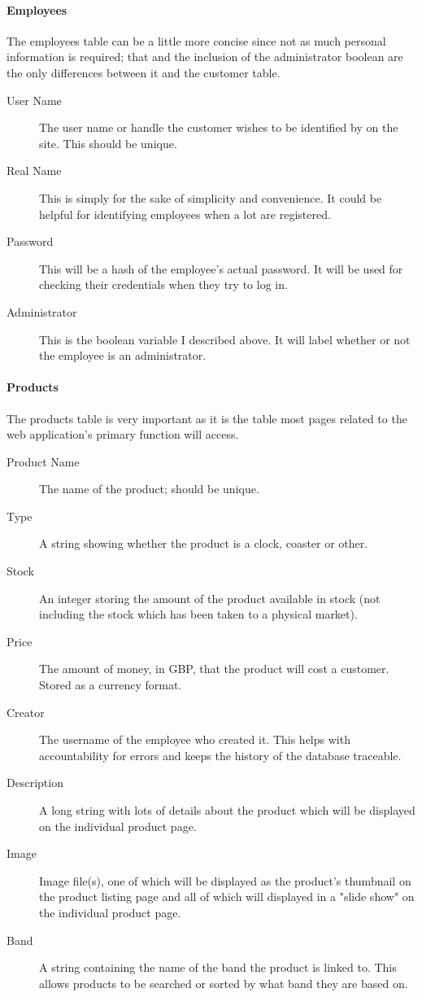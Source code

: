 ﻿\documentclass{article}
\begin{document}
    \paragraph{Employees}
    The employees table can be a little more concise since not as much personal information is required; that and the inclusion of the administrator boolean are the only differences between it and the customer table.
    \begin{description}
        \item[User Name] The user name or handle the customer wishes to be identified by on the site.
        This should be unique.
        \item[Real Name] This is simply for the sake of simplicity and convenience.
        It could be helpful for identifying employees when a lot are registered.
        \item[Password] This will be a hash of the employee's actual password.
        It will be used for checking their credentials when they try to log in.
        \item[Administrator] This is the boolean variable I described above.
        It will label whether or not the employee is an administrator.
    \end{description}
	\paragraph{Products}
    The products table is very important as it is the table most pages related to the web application's primary function will access.
    \begin{description}
        \item[Product Name] The name of the product; should be unique.
        \item[Type] A string showing whether the product is a clock, coaster or other.
        \item[Stock] An integer storing the amount of the product available in stock (not including the stock which has been taken to a physical market).
        \item[Price] The amount of money, in GBP, that the product will cost a customer.
        Stored as a currency format.
        \item[Creator] The username of the employee who created it.
        This helps with accountability for errors and keeps the history of the database traceable.
        \item[Description] A long string with lots of details about the product which will be displayed on the individual product page.
        \item[Image] Image file(s), one of which will be displayed as the product's thumbnail on the product listing page and all of which will displayed in a "slide show" on the individual product page.
        \item[Band] A string containing the name of the band the product is linked to.
        This allows products to be searched or sorted by what band they are based on.
    \end{description}
\end{document}
